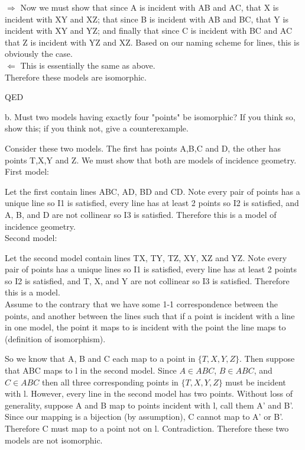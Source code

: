 \documentclass[12pt,letterpaper]{article}
\newcommand{\QED}{\begin{flushright}QED\end{flushright}}
\begin{document}
$\Rightarrow$
Now we must show that since A is incident with AB and AC, that X is incident with XY and XZ; that since B is incident with AB and BC, that Y is incident with XY and YZ; and finally that since C is incident with BC and AC that Z is incident with YZ and XZ.  Based on our naming scheme for lines, this is obviously the case. \\


$\Leftarrow$
This is essentially the same as above.\\


 Therefore these models are isomorphic.
\QED

\newpage 



b. Must two models having exactly four "points" be isomorphic?  If you think so, show this;  if you think not, give a counterexample.\\


Consider these two models. The first has points A,B,C and D, the other has points T,X,Y and Z.  We must show that both are models of incidence geometry.\\

\noindent First model:

Let the first contain lines ABC, AD, BD and CD.  Note every pair of points has a unique line so I1 is satisfied, every line has at least 2 points so I2 is satisfied, and A, B, and D are not collinear so I3 is satisfied. Therefore this is a model of incidence geometry.\\

\noindent Second model: 

Let the second model contain lines TX, TY, TZ, XY, XZ and YZ.  Note every pair of points has a unique lines so I1 is satisfied, every line has at least 2 points so I2 is satisfied, and T, X, and Y are not collinear so I3 is satisfied. Therefore this is a model.\\


Assume to the contrary that we have some 1-1 correspondence between the points, and another between the lines such that if a point is incident with a line in one model, the point it maps to is incident with the point the line maps to (definition of isomorphism).  

So we know that A, B and C each map to a point in $\{T,X,Y,Z\}$. Then suppose that ABC maps to l in the second model.  Since $A\in ABC$, $B\in ABC$, and $C\in ABC$ then all three corresponding points in $\{T,X,Y,Z\}$ must be incident with l.  However, every line in the second model has two points.  Without loss of generality, suppose A and B map to points incident with l, call them A' and B'.  Since our mapping is a bijection (by assumption), C cannot map to A' or B'.  Therefore C must map to a point not on l.  Contradiction.  Therefore these two models are not isomorphic.
\end{document}
